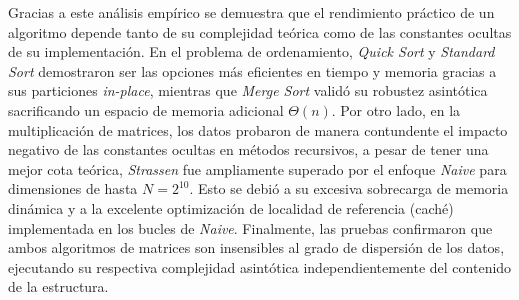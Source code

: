 Gracias a este análisis empírico se demuestra que el rendimiento práctico de un algoritmo depende tanto de su complejidad teórica como de las constantes ocultas de su implementación. En el problema de ordenamiento, \textit{Quick Sort} y \textit{Standard Sort} demostraron ser las opciones más eficientes en tiempo y memoria gracias a sus particiones \textit{in-place}, mientras que \textit{Merge Sort} validó su robustez asintótica sacrificando un espacio de memoria adicional $\Theta(n)$. Por otro lado, en la multiplicación de matrices, los datos probaron de manera contundente el impacto negativo de las constantes ocultas en métodos recursivos, a pesar de tener una mejor cota teórica, \textit{Strassen} fue ampliamente superado por el enfoque \textit{Naive} para dimensiones de hasta $N=2^{10}$. Esto se debió a su excesiva sobrecarga de memoria dinámica y a la excelente optimización de localidad de referencia (caché) implementada en los bucles de \textit{Naive}. Finalmente, las pruebas confirmaron que ambos algoritmos de matrices son insensibles al grado de dispersión de los datos, ejecutando su respectiva complejidad asintótica independientemente del contenido de la estructura.